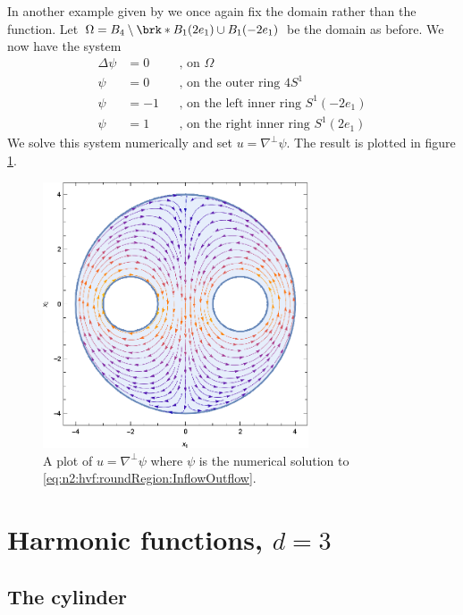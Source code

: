 In another example given by \cite{Wahlen2023} we once again fix the domain rather than the function.
Let $\Omega=B_4\setminus\brk*{B_1(2e_1)\cup B_1(-2e_1)}$ be the domain as before.
We now have the system
\begin{equation}
  \begin{aligned}
    \Delta \psi&=0 &&\text{, on }\Omega \\
    \psi&=0 &&\text{, on the outer ring }4S^1 \\
    \psi&=-1 &&\text{, on the left inner ring }S^1(-2e_1) \\
    \psi&=1 &&\text{, on the right inner ring }S^1(2e_1)
  \end{aligned}\label{eq:n2:hvf:roundRegion:InflowOutflow}
\end{equation}
We solve this system numerically and set $u=\nabla^\perp\psi$.
The result is plotted in figure \ref{pl:n2_hvf_roundRegion_InflowOutflow}.
\begin{figure}
  \centering
  \includegraphics[width=0.7\textwidth]{../Plots/HarmonicVectorFields_gr5.eps}
  \caption{A plot of $u=\nabla^\perp\psi$ where $\psi$ is the numerical solution to
   \eqref{eq:n2:hvf:roundRegion:InflowOutflow}.}
  \label{pl:n2_hvf_roundRegion_InflowOutflow}
\end{figure}

\newpage

\section{Harmonic functions, $d=3$}

\subsection{The cylinder}

